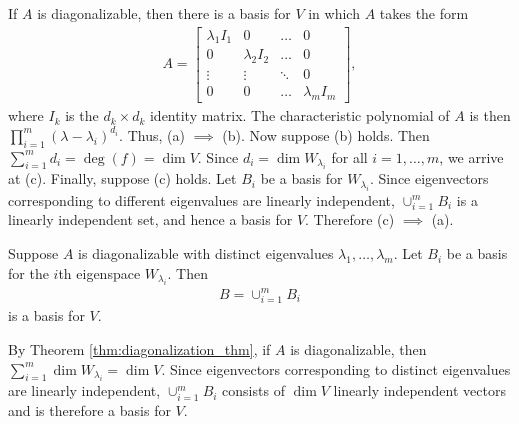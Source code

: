 \documentclass[12pt,letterpaper,reqno]{article}
\numberwithin{equation}{section}
\begin{document}
\begin{pf}
If $A$ is diagonalizable, then there is a basis for $V$ in which $A$ takes the form
\begin{align*}
	A=\begin{bmatrix}
		\lambda_1 I_1 & 0 & \dots & 0 \\
		0 & \lambda_2 I_2 & \dots & 0 \\
		\vdots & \vdots & \ddots & 0 \\
		0 & 0 & \dots & \lambda_m I_m 
	\end{bmatrix},
\end{align*}	
where $I_k$ is the $d_k \times d_k$ identity matrix. The characteristic polynomial of $A$ is then $\prod_{i=1}^m(\lambda-\lambda_i)^{d_i}$. Thus, (a) $\implies$ (b). Now suppose (b) holds. Then $\sum_{i=1}^m d_i=\deg(f)=\dim V$. Since $d_i=\dim W_{\lambda_i}$ for all $i=1,\dots,m$, we arrive at (c). Finally, suppose (c) holds. Let $B_i$ be a basis for $W_{\lambda_i}$. Since eigenvectors corresponding to different eigenvalues are linearly independent, $\cup_{i=1}^m B_i$ is a linearly independent set, and hence a basis for $V$. Therefore (c) $\implies$ (a).
\end{pf}

\begin{thm}
Suppose $A$ is diagonalizable with distinct eigenvalues $\lambda_1,\dots,\lambda_m$. Let $B_i$ be a basis for the $i$th eigenspace $W_{\lambda_i}$. Then
\begin{align*}
	B=\cup_{i=1}^m B_i
\end{align*}	
is a basis for $V$.
\end{thm}

\begin{pf}
	By Theorem \ref{thm:diagonalization_thm}, if $A$ is diagonalizable, then $\sum_{i=1}^m \dim W_{\lambda_i}=\dim V$. Since eigenvectors corresponding to distinct eigenvalues are linearly independent, $\cup_{i=1}^m B_i$ consists of $\dim V$ linearly independent vectors and is therefore a basis for $V$.
\end{pf}
 
\end{document}
